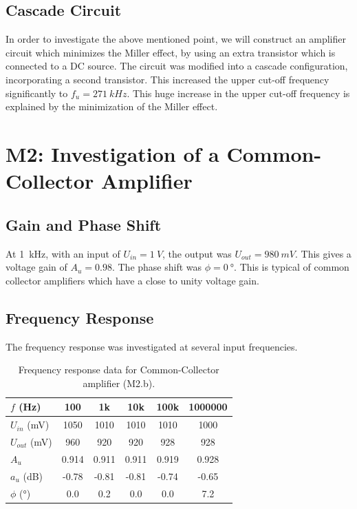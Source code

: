 \documentclass[12pt,a4paper]{article}
\begin{document}
\subsection{Cascade Circuit}
In order to investigate the above mentioned point, we will construct an amplifier circuit which minimizes the Miller effect, by using an extra transistor which is connected to a DC source. The circuit was modified into a cascade configuration, incorporating a second transistor. This increased the upper cut-off frequency significantly to $f_u = \SI{271}{kHz}$. This huge increase in the upper cut-off frequency is explained by the minimization of the Miller effect.

\section{M2: Investigation of a Common-Collector Amplifier}

\subsection{Gain and Phase Shift}
At \SI{1}{kHz}, with an input of $U_{in} = \SI{1}{V}$, the output was $U_{out} = \SI{980}{mV}$. This gives a voltage gain of $A_u = 0.98$. The phase shift was $\phi = \SI{0}{\degree}$. This is typical of common collector amplifiers which have a close to unity voltage gain.

\subsection{Frequency Response}
The frequency response was investigated at several input frequencies.

\begin{table}[H]
    \centering
    \caption{Frequency response data for Common-Collector amplifier (M2.b).}
    \label{tab:freq_response_m2}
    \begin{tabular}{lccccc}
        \toprule
        {$f$ (\si{Hz})} & 100 & 1k & 10k & 100k & 1000000 \\
        \midrule
        {$U_{in}$ (\si{mV})} & 1050 & 1010 & 1010 & 1010 & 1000 \\
        {$U_{out}$ (\si{mV})} & 960 & 920 & 920 & 928 & 928 \\
        {$A_u$} & 0.914 & 0.911 & 0.911 & 0.919 & 0.928 \\
        {$a_u$ (\si{dB})} & -0.78 & -0.81 & -0.81 & -0.74 & -0.65 \\
        {$\phi$ (\si{\degree})} & 0.0 & 0.2 & 0.0 & 0.0 & 7.2 \\
        \bottomrule
    \end{tabular}
\end{table}
\end{document}
